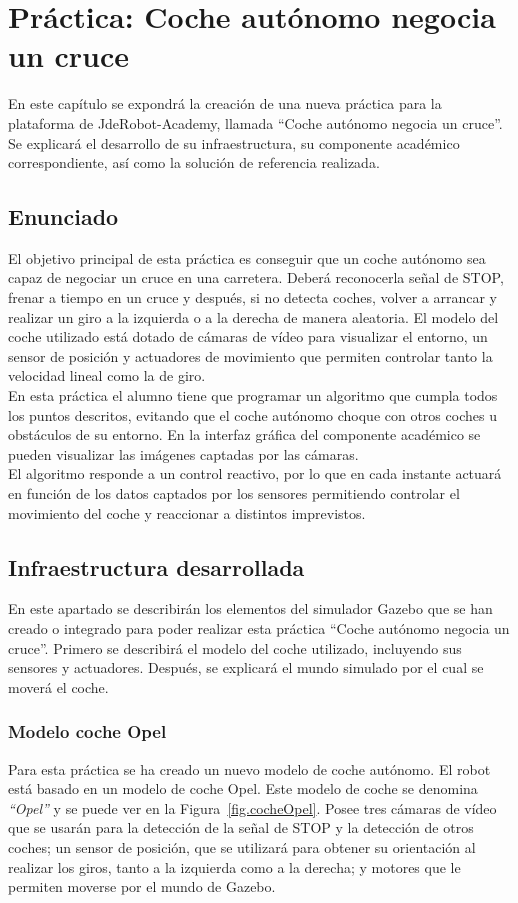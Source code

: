 \chapter{Práctica: Coche autónomo negocia un cruce}\label{cap.stop}
En este capítulo se expondrá la creación de una nueva práctica para la plataforma de JdeRobot-Academy, llamada ``Coche autónomo negocia un cruce''. Se explicará el desarrollo de su infraestructura, su componente académico correspondiente, así como la solución de referencia realizada. 

\section{Enunciado} \label{sec.enunciado}
El objetivo principal de esta práctica es conseguir que un coche autónomo sea capaz de negociar un cruce en una carretera. Deberá reconocerla señal de STOP, frenar a tiempo en un cruce y después, si no detecta coches, volver a arrancar y realizar un giro a la izquierda o a la derecha de manera aleatoria. El modelo del coche utilizado está dotado de cámaras de vídeo para visualizar el entorno, un sensor de posición y actuadores de movimiento que permiten controlar tanto la velocidad lineal como la de giro. \\

En esta práctica el alumno tiene que programar un algoritmo que cumpla todos los puntos descritos, evitando que el coche autónomo choque con otros coches u obstáculos de su entorno. En la interfaz gráfica del componente académico se pueden visualizar las imágenes captadas por las cámaras.\\

El algoritmo responde a un control reactivo, por lo que en cada instante actuará en función de los datos captados por los sensores permitiendo controlar el movimiento del coche y reaccionar a distintos imprevistos.

\section{Infraestructura desarrollada}
En este apartado se describirán los elementos del simulador Gazebo que se han creado o integrado para poder realizar esta práctica ``Coche autónomo negocia un cruce''. Primero se describirá el modelo del coche utilizado, incluyendo sus sensores y actuadores. Después, se explicará el mundo simulado por el cual se moverá el coche. 

\subsection{Modelo coche Opel}
Para esta práctica se ha creado un nuevo modelo de coche autónomo. El robot está basado en un modelo de coche Opel. Este modelo de coche se denomina \textit{``Opel''} y se puede ver en la Figura~\ref{fig.cocheOpel}. Posee tres cámaras de vídeo que se usarán para la detección de la señal de STOP y la detección de otros coches; un sensor de posición, que se utilizará para obtener su orientación al realizar los giros, tanto a la izquierda como a la derecha; y motores que le permiten moverse por el mundo de Gazebo.

